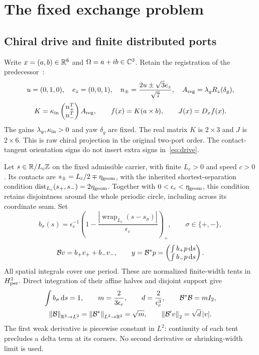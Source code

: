 \section{The fixed exchange problem}\label{sec:problem}
\subsection{Chiral drive and finite distributed ports}\label{sec:ports}
Write $x=(a,b)\in\mathbb R^6$ and $\Omega=a+ib\in\mathbb C^3$. Retain the registration of the predecessor~\cite[Section 1]{baseline}:
\begin{equation}\label{eq:registration}
u=(0,1,0),\quad e_z=(0,0,1),\quad
n_\pm=\frac{2u\pm\sqrt3e_z}{\sqrt7},\quad
A_{\rm reg}=\lambda_gR_z(\delta_g),
\end{equation}
\begin{equation}\label{eq:drive}
K=\kappa_{\rm in}\begin{pmatrix}n_+^T\\n_-^T\end{pmatrix}A_{\rm reg},
\qquad f(x)=K(a\times b),\qquad J(x)=D_xf(x).
\end{equation}
The gains $\lambda_g,\kappa_{\rm in}>0$ and yaw $\delta_g$ are fixed. The real matrix $K$ is $2\times3$ and $J$ is $2\times6$. This is raw chiral projection in the original two-port order. The contact-tangent orientation signs do not insert extra signs in~\eqref{eq:drive}.

Let $s\in\mathbb R/L_c\mathbb Z$ on the fixed admissible carrier, with finite $L_c>0$ and speed $c>0$. Its contacts are $s_\pm=L_c/2\mp\eta_{\rm geom}$, with the inherited shortest-separation condition
$\operatorname{dist}_{L_c}(s_+,s_-)=2\eta_{\rm geom}$.
Together with $0<\epsilon_c<\eta_{\rm geom}$, this condition retains disjointness around the whole periodic circle, including across its coordinate seam. Set
\begin{equation}\label{eq:tents}
b_\sigma(s)=\epsilon_c^{-1}
\left(1-\frac{|\operatorname{wrap}_{L_c}(s-s_\sigma)|}{\epsilon_c}\right)_+,
\qquad \sigma\in\{+,-\},
\end{equation}
\begin{equation}\label{eq:ports}
\mathcal B v=b_+v_++b_-v_-,\qquad
y=\mathcal B^*p=\begin{pmatrix}\int b_+p\,\mathrm d s\\\int b_-p\,\mathrm d s\end{pmatrix}.
\end{equation}
All spatial integrals cover one period. These are normalized finite-width tents in $H^1_{\rm per}$. Direct integration of their affine halves and disjoint support give
\begin{equation}\label{eq:profilenorms}
\begin{gathered}
\int b_\sigma\,\mathrm d s=1,\qquad m=\frac2{3\epsilon_c},\qquad
d=\frac2{\epsilon_c^3},\qquad \mathcal B^*\mathcal B=mI_2,\\
\left\|\mathcal B\right\|_{\mathbb R^2\to L^2}=\left\|\mathcal B^*\right\|_{L^2\to\mathbb R^2}=\sqrt m,\qquad
\left\|\mathcal B'v\right\|_2=\sqrt d\,|v|.
\end{gathered}
\end{equation}
The first weak derivative is piecewise constant in $L^2$: continuity of each tent precludes a delta term at its corners. No second derivative or shrinking-width limit is used.

